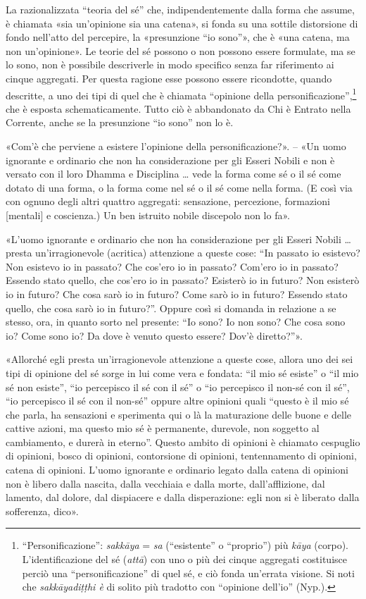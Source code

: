  La razionalizzata “teoria del sé” che,
indipendentemente dalla forma che assume, è chiamata «sia un’opinione
sia una catena», si fonda su una sottile distorsione di fondo nell’atto
del percepire, la «presunzione “io sono”», che è «una catena, ma non
un’opinione». Le teorie del sé possono o non possono essere formulate,
ma se lo sono, non è possibile descriverle in modo specifico senza far
riferimento ai cinque aggregati. Per questa ragione esse possono essere
ricondotte, quando descritte, a uno dei tipi di quel che è chiamata
“opinione della personificazione”,\footnote{“Personificazione”: \emph{sakkāya} = \emph{sa} (“esistente” o “proprio”) più \emph{kāya} (corpo). L’identificazione del sé (\emph{attā}) con uno o più dei cinque aggregati costituisce perciò una “personificazione” di quel sé, e ciò fonda un’errata visione. Si noti che \emph{sakkāyadiṭṭhi è} di solito più tradotto con “opinione dell’io” (Nyp.).} che è esposta
schematicamente. Tutto ciò è abbandonato da Chi è Entrato nella
Corrente, anche se la presunzione “io sono” non lo è.


 \label{pag259}«Com’è che perviene a esistere l’opinione della
personificazione?». – «Un uomo ignorante e ordinario che non ha
considerazione per gli Esseri Nobili e non è versato con il loro Dhamma
e Disciplina … vede la forma come sé o il sé come dotato di una forma, o
la forma come nel sé o il sé come nella forma. (E così via con ognuno
degli altri quattro aggregati: sensazione, percezione, formazioni
[mentali] e coscienza.) Un ben istruito nobile discepolo non lo fa».




«L’uomo ignorante e ordinario che non ha considerazione per gli Esseri
Nobili … presta un’irragionevole (acritica) attenzione a queste cose:
“In passato io esistevo? Non esistevo io in passato? Che cos’ero io in
passato? Com’ero io in passato? Essendo stato quello, che cos’ero io in
passato? Esisterò io in futuro? Non esisterò io in futuro? Che cosa sarò
io in futuro? Come sarò io in futuro? Essendo stato quello, che cosa
sarò io in futuro?”. Oppure così si domanda in relazione a se stesso,
ora, in quanto sorto nel presente: “Io sono? Io non sono? Che cosa sono
io? Come sono io? Da dove è venuto questo essere? Dov’è diretto?”».


«Allorché egli presta un’irragionevole attenzione a queste cose, allora
uno dei sei tipi di opinione del sé sorge in lui come vera e fondata:
“il mio sé esiste” o “il mio sé non esiste”, “io percepisco il sé con il
sé” o “io percepisco il non-sé con il sé”, “io percepisco il sé con il
non-sé” oppure altre opinioni quali “questo è il mio sé che parla, ha
sensazioni e sperimenta qui o là la maturazione delle buone e delle
cattive azioni, ma questo mio sé è permanente, durevole, non soggetto al
cambiamento, e durerà in eterno”. Questo ambito di opinioni è chiamato
cespuglio di opinioni, bosco di opinioni, contorsione di opinioni,
tentennamento di opinioni, catena di opinioni. L’uomo ignorante e
ordinario legato dalla catena di opinioni non è libero dalla nascita,
dalla vecchiaia e dalla morte, dall’afflizione, dal lamento, dal dolore,
dal dispiacere e dalla disperazione: egli non si è liberato dalla
sofferenza, dico».


